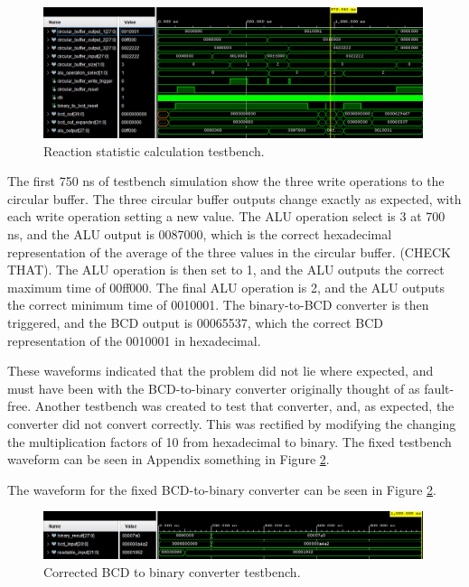 \documentclass[11pt]{article}
\begin{document}
\begin{figure}[H]
  \centering
  \includegraphics[width=0.99\textwidth]{WhatsApp Image 2025-05-07 at 11.33.07.jpeg}
  \caption{Reaction statistic calculation testbench.}
  \label{fig:alu_testbench}
\end{figure}

The first 750 ns of testbench simulation show the three write operations to the circular buffer. The three circular buffer outputs change exactly as expected, with each write operation setting a new value. The ALU operation select is 3 at 700 ns, and the ALU output is 0087000, which is the correct hexadecimal representation of the average of the three values in the circular buffer. (CHECK THAT). The ALU operation is then set to 1, and the ALU outputs the correct maximum time of 00ff000. The final ALU operation is 2, and the ALU outputs the correct minimum time of 0010001. The binary-to-BCD converter is then triggered, and the BCD output is 00065537, which the correct BCD representation of the 0010001 in hexadecimal.

These waveforms indicated that the problem did not lie where expected, and must have been with the BCD-to-binary converter originally thought of as fault-free. Another testbench was created to test that converter, and, as expected, the converter did not convert correctly. This was rectified by modifying the changing the multiplication factors of 10 from hexadecimal to binary. The fixed testbench waveform can be seen in Appendix something in Figure \ref{fig:correct_converter_tb}.

The waveform for the fixed BCD-to-binary converter can be seen in Figure \ref{fig:correct_converter_tb}.

\begin{figure}[H]
  \centering
  \includegraphics[width=0.99\textwidth]{WhatsApp Image 2025-05-08 at 16.13.24}
  \caption{Corrected BCD to binary converter testbench.}
  \label{fig:correct_converter_tb}
\end{figure}
\end{document}

